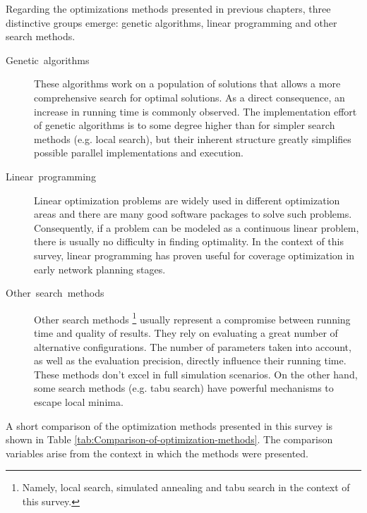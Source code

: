 Regarding the optimizations methods presented in previous chapters,
three distinctive groups emerge: genetic algorithms, linear programming
and other search methods.
\begin{description}
\item [{Genetic~algorithms}] These algorithms work on a population of
solutions that allows a more comprehensive search for optimal solutions.
As a direct consequence, an increase in running time is commonly observed.
The implementation effort of genetic algorithms is to some degree
higher than for simpler search methods (e.g. local search), but their
inherent structure greatly simplifies possible parallel implementations
and execution.
\item [{Linear~programming}] Linear optimization problems are widely used
in different optimization areas and there are many good software packages
to solve such problems. Consequently, if a problem can be modeled
as a continuous linear problem, there is usually no difficulty in
finding optimality. In the context of this survey, linear programming
has proven useful for coverage optimization in early network planning
stages.\\

\item [{Other~search~methods}] Other search methods%
\footnote{Namely, local search, simulated annealing and tabu search in the context
of this survey.%
} usually represent a compromise between running time and quality of
results. They rely on evaluating a great number of alternative configurations.
The number of parameters taken into account, as well as the evaluation
precision, directly influence their running time. These methods don't
excel in full simulation scenarios. On the other hand, some search
methods (e.g. tabu search) have powerful mechanisms to escape local
minima.
\end{description}
A short comparison of the optimization methods presented in this survey
is shown in Table \ref{tab:Comparison-of-optimization-methods}. The
comparison variables arise from the context in which the methods were
presented.

